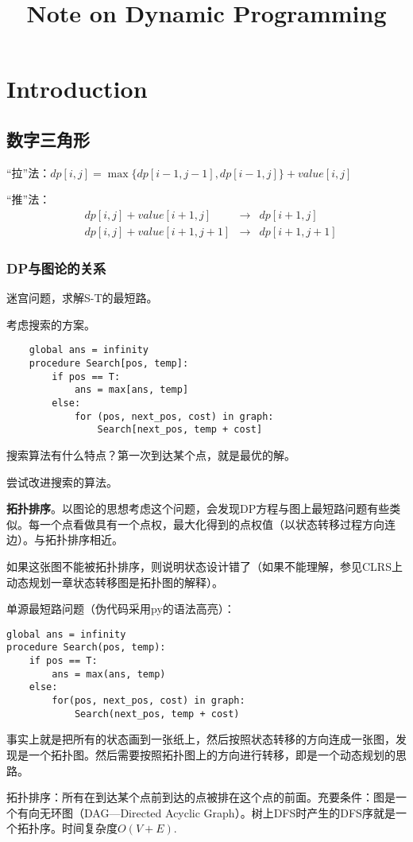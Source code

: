 \documentclass{article}
\begin{document}
\title{Note on Dynamic Programming}
\section{Introduction}
\subsection{数字三角形}
“拉”法：$dp[i,j]=\max\{dp[i-1,j-1],dp[i-1,j]\}+value[i,j]$

“推”法：
\begin{equation*}
\begin{aligned}
&dp[i,j]+value[i+1,j]&\to&dp[i+1,j]\\
&dp[i,j]+value[i+1,j+1]&\to&dp[i+1,j+1]
\end{aligned}
\end{equation*}
\subsubsection{DP与图论的关系}
迷宫问题，求解S-T的最短路。

考虑搜索的方案。
\begin{verbatim}
    global ans = infinity
    procedure Search[pos, temp]:
        if pos == T:
            ans = max[ans, temp]
        else:
            for (pos, next_pos, cost) in graph:
                Search[next_pos, temp + cost]
\end{verbatim}

搜索算法有什么特点？第一次到达某个点，就是最优的解。

尝试改进搜索的算法。

\textbf{拓扑排序}。以图论的思想考虑这个问题，会发现DP方程与图上最短路问题有些类似。每一个点看做具有一个点权，最大化得到的点权值（以状态转移过程方向连边）。与拓扑排序相近。

如果这张图不能被拓扑排序，则说明状态设计错了（如果不能理解，参见CLRS上动态规划一章状态转移图是拓扑图的解释）。

单源最短路问题（伪代码采用py的语法高亮）：
\begin{verbatim}
global ans = infinity
procedure Search(pos, temp):
    if pos == T:
        ans = max(ans, temp)
    else:
        for(pos, next_pos, cost) in graph:
            Search(next_pos, temp + cost)
\end{verbatim}
事实上就是把所有的状态画到一张纸上，然后按照状态转移的方向连成一张图，发现是一个拓扑图。然后需要按照拓扑图上的方向进行转移，即是一个动态规划的思路。

拓扑排序：所有在到达某个点前到达的点被排在这个点的前面。充要条件：图是一个有向无环图（DAG---Directed Acyclic Graph）。树上DFS时产生的DFS序就是一个拓扑序。时间复杂度$O(V+E)$.
\end{document}

